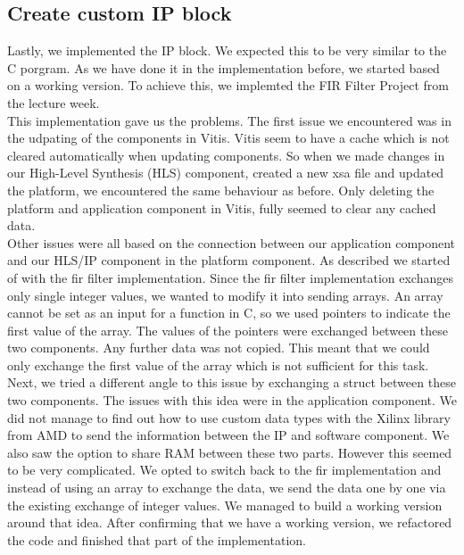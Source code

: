 \documentclass[conference]{IEEEtran}
\begin{document}
\subsection{Create custom IP block}
Lastly, we implemented the IP block. We expected this to be very similar to the C porgram. As we have done it in the implementation before, we started based on a working version. To achieve this, we implemted the FIR Filter Project from the lecture week. \\
This implementation gave us the problems. The first issue we encountered was in the udpating of the components in Vitis. Vitis seem to have a cache which is not cleared automatically when updating components. So when we made changes in our High-Level Synthesis (HLS) component, created a new xsa file and updated the platform, we encountered the same behaviour as before. Only deleting the platform and application component in Vitis, fully seemed to clear any cached data. \\
Other issues were all based on the connection between our application component and our HLS/IP component in the platform component. As described we started of with the fir filter implementation. Since the fir filter implementation exchanges only single integer values, we wanted to modify it into sending arrays. An array cannot be set as an input for a function in C, so we used pointers to indicate the first value of the array. The values of the pointers were exchanged between these two components. Any further data was not copied. This meant that we could only exchange the first value of the array which is not sufficient for this task. Next, we tried a different angle to this issue by exchanging a struct between these two components. The issues with this idea were in the application component. We did not manage to find out how to use custom data types with the Xilinx library from AMD to send the information between the IP and software component. We also saw the option to share RAM between these two parts. However this seemed to be very complicated. We opted to switch back to the fir implementation and instead of using an array to exchange the data, we send the data one by one via the existing exchange of integer values. We managed to build a working version around that idea. After confirming that we have a working version, we refactored the code and finished that part of the implementation. \\
\end{document}

